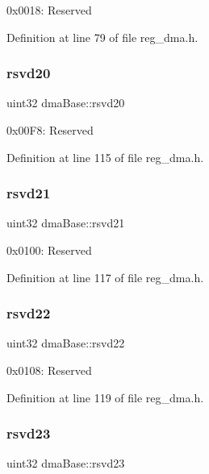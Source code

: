 0x0018\+: Reserved 

Definition at line 79 of file reg\+\_\+dma.\+h.

\mbox{\label{structdmaBase_a9e2ca758193a091e78c9a0f21ef2e5a9}} 
\subsubsection{\texorpdfstring{rsvd20}{rsvd20}}
{\footnotesize\ttfamily uint32 dma\+Base\+::rsvd20}

0x00\+F8\+: Reserved 

Definition at line 115 of file reg\+\_\+dma.\+h.

\mbox{\label{structdmaBase_a4f8a53a8870c790e8fbab2c256ecdece}} 
\subsubsection{\texorpdfstring{rsvd21}{rsvd21}}
{\footnotesize\ttfamily uint32 dma\+Base\+::rsvd21}

0x0100\+: Reserved 

Definition at line 117 of file reg\+\_\+dma.\+h.

\mbox{\label{structdmaBase_aa6144648bb771618de3f7c1ae2fc96a8}} 
\subsubsection{\texorpdfstring{rsvd22}{rsvd22}}
{\footnotesize\ttfamily uint32 dma\+Base\+::rsvd22}

0x0108\+: Reserved 

Definition at line 119 of file reg\+\_\+dma.\+h.

\mbox{\label{structdmaBase_a1785a813fbc27812881a38c7fb2a19ce}} 
\subsubsection{\texorpdfstring{rsvd23}{rsvd23}}
{\footnotesize\ttfamily uint32 dma\+Base\+::rsvd23}

